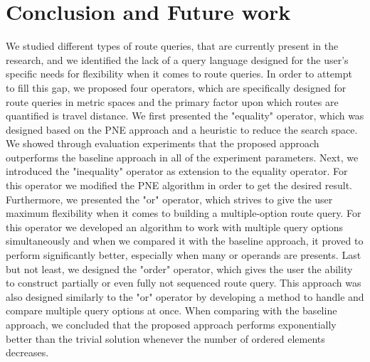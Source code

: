 \chapter{Conclusion and Future work}
\label{sec:conclusion}
We studied different types of route queries, that are currently present in the research, and we identified the lack of a query language designed for the user's specific needs for flexibility when it comes to route queries. In order to attempt to fill this gap, we proposed four operators, which are specifically designed for route queries in metric spaces and the primary factor upon which routes are quantified is travel distance. 
We first presented the "equality" operator, which was designed based on the PNE approach \cite{OSR} and a heuristic to reduce the search space. We showed through evaluation experiments that the proposed approach outperforms the baseline approach in all of the experiment parameters. Next, we introduced the "inequality" operator as extension to the equality operator. For this operator we modified the PNE algorithm in order to get the desired result. Furthermore, we presented the "or" operator, which strives to give the user maximum flexibility when it comes to building a multiple-option route query. For this operator we developed an algorithm to work with multiple query options simultaneously and when we compared it with the baseline approach, it proved to perform significantly better, especially when many or operands are presents. Last but not least, we designed the "order" operator, which gives the user the ability to construct partially or even fully not sequenced route query. This approach was also designed similarly to the "or" operator by developing a method to handle and compare multiple query options at once. When comparing with the baseline approach, we concluded that the proposed approach performs exponentially better than the trivial solution whenever the number of ordered elements decreases.


